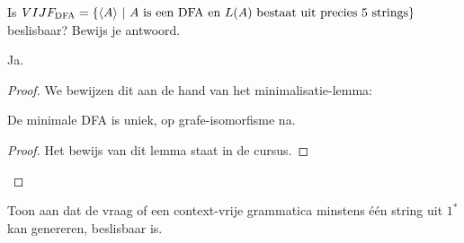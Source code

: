 \documentclass[a4paper]{article}
\begin{document}
\begin{question}
Is $VIJF_{\rm DFA} = \{ \langle A \rangle \ | \ \text{$A$ is een DFA en $L(A)$ bestaat uit precies 5 strings} \} $ beslisbaar? Bewijs je antwoord.
\begin{answer}
Ja.
\begin{proof}
We bewijzen dit aan de hand van het minimalisatie-lemma:
\begin{lemma}
De minimale DFA is uniek, op grafe-isomorfisme na.
\begin{proof}
Het bewijs van dit lemma staat in de cursus.
\end{proof}
\end{lemma}

\end{proof}
\end{answer}
\end{question}

\begin{question}
Toon aan dat de vraag of een context-vrije grammatica minstens \'e\'en string uit $1^*$ kan genereren, beslisbaar is.
\end{question}
\end{document}
